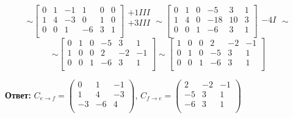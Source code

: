 \documentclass[12pt]{article}
\begin{document}
$$
	\sim
	\left[
		\begin{array}{ccc|ccc}
			0 & 1 & -1 & 1  & 0 & 0 \\
			1 & 4 & -3 & 0  & 1 & 0 \\
			0 & 0 & 1  & -6 & 3 & 1 \\
		\end{array}
		\right]
	\begin{matrix} +1III \\ +3III \\\\\end{matrix} \sim
	\left[
		\begin{array}{ccc|ccc}
			0 & 1 & 0 & -5  & 3  & 1 \\
			1 & 4 & 0 & -18 & 10 & 3 \\
			0 & 0 & 1 & -6  & 3  & 1 \\
		\end{array}
		\right]
	\begin{matrix} \\ -4I \\\\\end{matrix} \sim
$$
$$
	\sim
	\left[
		\begin{array}{ccc|ccc}
			0 & 1 & 0 & -5 & 3  & 1  \\
			1 & 0 & 0 & 2  & -2 & -1 \\
			0 & 0 & 1 & -6 & 3  & 1  \\
		\end{array}
		\right]
	\sim
	\left[
		\begin{array}{ccc|ccc}
			1 & 0 & 0 & 2  & -2 & -1 \\
			0 & 1 & 0 & -5 & 3  & 1  \\
			0 & 0 & 1 & -6 & 3  & 1  \\
		\end{array}
		\right]
$$

\textbf{Ответ:} $C_{e \rightarrow f} = \begin{pmatrix} 0  & 1  & -1 \\ 1  & 4  & -3 \\ -3 & -6 & 4  \\ \end{pmatrix}$, $C_{f \rightarrow e} = \begin{pmatrix} 2 & -2 & -1 \\ -5 & 3 & 1 \\ -6 & 3 & 1 \\ \end{pmatrix}$
\end{document}
